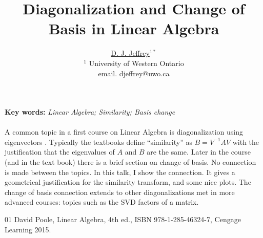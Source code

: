 \documentclass[a4paper,11pt]{article}
\begin{document}
\title{Diagonalization and Change of Basis  in Linear Algebra}
\author{
 \underline{D. J. Jeffrey}$^{1*}$ \\
$^{1}$ University of Western Ontario \\
 email. djeffrey@uwo.ca
}

\date{}
\maketitle

\noindent \textbf{Key words:}
\emph{%
Linear Algebra; 
Similarity;
Basis change
}
\\\\
A common topic in a first course on Linear Algebra is
diagonalization using eigenvectors \cite{poole}. Typically the textbooks define
``similarity'' as $B=V^{-1} A V$  with the justification that the eigenvalues
of $A$ and $B$ are the same. Later in the course (and in the text book)
there is a brief section on change of basis. No connection is made
between the topics. In this talk, I show the connection. It gives a
geometrical justification for the similarity transform, and some nice
plots. The change of basis connection extends to other diagonalizations
met in more advanced courses: topics such as the SVD factors of a matrix.




\begin{thebibliography}{01}
 David Poole, Linear Algebra, 4th ed., ISBN 978-1-285-46324-7, Cengage Learning 2015.
\end{thebibliography}
\end{document}

